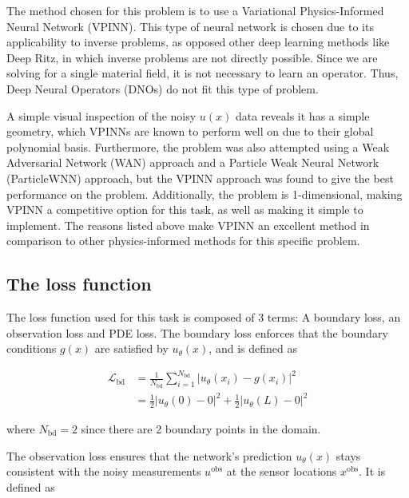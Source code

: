 
The method chosen for this problem is to use a Variational Physics-Informed Neural Network (VPINN). This type of neural network is chosen due to its applicability to inverse problems, as opposed other deep learning methods like Deep Ritz, in which inverse problems are not directly possible. Since we are solving for a single material field, it is not necessary to learn an operator. Thus, Deep Neural Operators (DNOs) do not fit this type of problem.

A simple visual inspection of the noisy $u(x)$ data reveals it has a simple geometry, which VPINNs are known to perform well on due to their global polynomial basis. Furthermore, the problem was also attempted using a Weak Adversarial Network (WAN) approach and a Particle Weak Neural Network (ParticleWNN) approach, but the VPINN approach was found to give the best performance on the problem. Additionally, the problem is 1-dimensional, making VPINN a competitive option for this task, as well as making it simple to implement. The reasons listed above make VPINN an excellent method in comparison to other physics-informed methods for this specific problem.

%
\subsection{The loss function}


The loss function used for this task is composed of 3 terms: A boundary loss, an observation loss and PDE loss. The boundary loss enforces that the boundary conditions $g(x)$ are satisfied by $u_\theta (x)$, and is defined as

\begin{align}
	\mathcal{L}_\mathrm{bd} &= \frac{1}{N_\mathrm{bd}} \sum_{i=1}^{N_\mathrm{bd}} \left| u_\theta (x_i) - g(x_i) \right|^2 \\
	&= \frac 12 \left| u_\theta (0) - 0 \right|^2 + \frac 12  \left| u_\theta (L) - 0 \right|^2
\end{align}

\noindent
where $N_\mathrm{bd} = 2$ since there are 2 boundary points in the domain.

The observation loss ensures that the network's prediction $u_\theta (x)$ stays consistent with the noisy measurements $u^\mathrm{obs}$ at the sensor locations $x^\mathrm{obs}$. It is defined as

